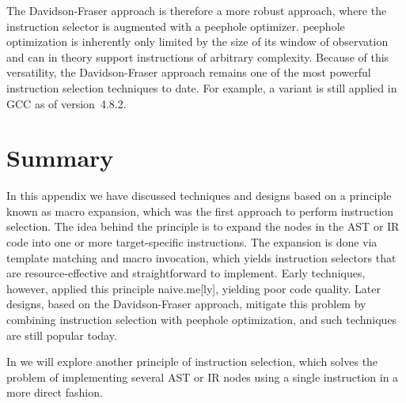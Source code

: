 The \gls{Davidson-Fraser approach} is therefore a more robust approach, where
the \gls{instruction selector} is augmented with a \gls{peephole optimizer}.
%
\Gls{peephole optimization} is inherently only limited by the size of its window
of observation and can in theory support \glspl{instruction} of arbitrary
complexity.
%
Because of this versatility, the \gls{Davidson-Fraser approach} remains one of
the most powerful \gls{instruction selection} techniques to date.
%
For example, a variant is still applied in \gls{GCC} as of version~\mbox{4.8.2}.


\section{Summary}

In this appendix we have discussed techniques and designs based on a
\gls{principle} known as \gls{macro expansion}, which was the first approach to
perform \gls{instruction selection}.
%
The idea behind the \gls{principle} is to expand the \glspl{node} in the
\gls{AST} or \gls{IR} code into one or more target-specific \glspl{instruction}.
%
The expansion is done via \gls{template} matching and \gls{macro} invocation,
which yields \glspl{instruction selector} that are resource-effective and
straightforward to implement.
%
Early techniques, however, applied this principle \gls{naive.me}[ly], yielding
poor code quality.
%
Later designs, based on the \gls{Davidson-Fraser approach}, mitigate this
problem by combining \gls{instruction selection} with \gls{peephole
  optimization}, and such techniques are still popular today.

In  we will explore another \gls{principle} of
\gls{instruction selection}, which solves the problem of implementing several
\gls{AST} or \gls{IR} \glspl{node} using a single \gls{instruction} in a more
direct fashion.
